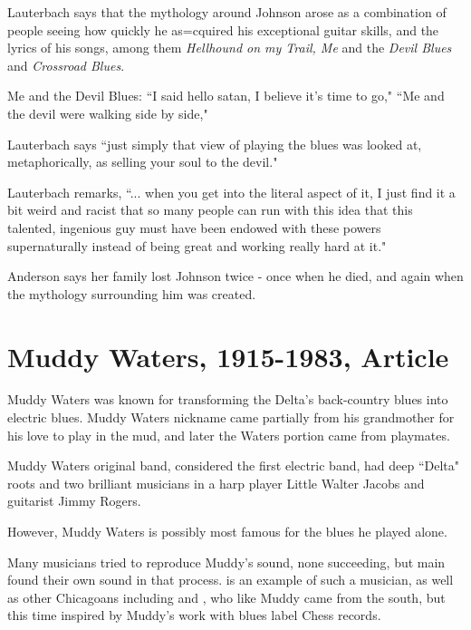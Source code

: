 \documentclass[12pt, a4paper, twoside, openright, titlepage]{book}
\begin{document}
Lauterbach says that the mythology around Johnson arose as a combination of people seeing how quickly he as=cquired his exceptional guitar skills, and the lyrics of his songs, among them \emph{Hellhound on my Trail, Me} and the \emph{Devil Blues} and \emph{Crossroad Blues}.

\begin{eg}{}{}
    Me and the Devil Blues: ``I said hello satan, I believe it's time to go," ``Me and the devil were walking side by side," 
\end{eg}

Lauterbach says ``just simply that view of playing the blues was looked at, metaphorically, as selling your soul to the devil."

\begin{note}{}{}
    Lauterbach remarks, ``... when you get into the literal aspect of it, I just find it a bit weird and racist that so many people can run with this idea that this talented, ingenious guy must have been endowed with these powers supernaturally instead of being great and working really hard at it."
\end{note}

Anderson says her family lost Johnson twice - once when he died, and again when the mythology surrounding him was created.


\section{Muddy Waters, 1915-1983, Article}

Muddy Waters was known for transforming the Delta's back-country blues into electric blues. Muddy Waters nickname came partially from his grandmother for his love to play in the mud, and later the Waters portion came from playmates.

\begin{rmk}{}{}
    Muddy Waters original band, considered the first electric band, had deep ``Delta" roots and two brilliant musicians in a harp player Little Walter Jacobs and guitarist Jimmy Rogers. 

    However, Muddy Waters is possibly most famous for the blues he played alone.
\end{rmk}

Many musicians tried to reproduce Muddy's sound, none succeeding, but main found their own sound in that process.  is an example of such a musician, as well as other Chicagoans including  and , who like Muddy came from the south, but this time inspired by Muddy's work with blues label Chess records.
\end{document}
